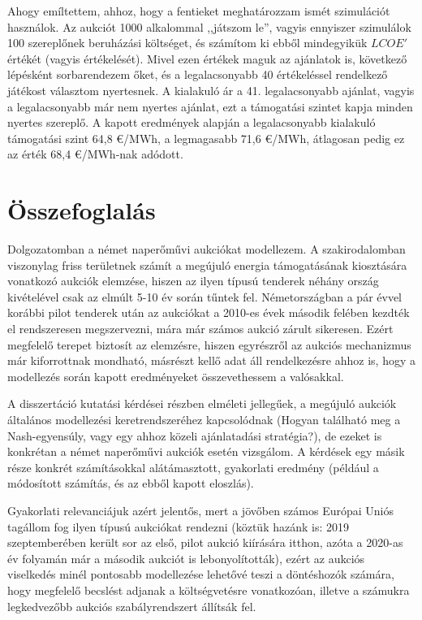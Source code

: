 \documentclass[twoside, magyar, showtrims]{corvinusphd}
\theoremstyle{plain}
\theoremstyle{remark}
\theoremstyle{definition}
\begin{document}
Ahogy emíltettem, ahhoz, hogy a fentieket meghatározzam ismét szimulációt használok.
Az aukciót 1000 alkalommal ,,játszom le'', vagyis ennyiszer
szimulálok 100 szereplőnek beruházási költséget, és számítom ki ebből
mindegyikük $LCOE'$ értékét (vagyis értékelését).
Mivel ezen értékek
maguk az ajánlatok is, következő lépésként sorbarendezem őket,
és a legalacsonyabb 40 értékeléssel rendelkező játékost választom nyertesnek.
A kialakuló ár a 41. legalacsonyabb ajánlat, vagyis a legalacsonyabb 
már nem nyertes ajánlat, ezt a támogatási szintet kapja minden nyertes szereplő.
A kapott eredmények alapján a legalacsonyabb kialakuló 
támogatási szint 64,8 €/MWh, a legmagasabb 71,6 €/MWh,
átlagosan pedig ez az érték 68,4 €/MWh-nak adódott.

\chapter{Összefoglalás}

\scwords Dolgozatomban a német naperőművi aukciókat modellezem.
A szakirodalomban viszonylag friss területnek számít
a megújuló energia támogatásának kiosztására
vonatkozó aukciók elemzése, hiszen az ilyen típusú
tenderek néhány ország kivételével csak az elmúlt 5-10
év során tűntek fel. Németországban a pár évvel korábbi
pilot tenderek után az aukciókat a 2010-es évek második felében
kezdték el rendszeresen megszervezni, mára már számos
aukció zárult sikeresen. Ezért megfelelő terepet biztosít
az elemzésre, hiszen egyrészről az aukciós mechanizmus
már kiforrottnak mondható, másrészt kellő adat
áll rendelkezésre ahhoz is, hogy a modellezés során
kapott eredményeket összevethessem a valósakkal.

A disszertáció kutatási kérdései részben elméleti jellegűek,
a megújuló aukciók általános modellezési keretrendszeréhez
kapcsolódnak (Hogyan található meg a Nash-egyensúly,
vagy egy ahhoz közeli ajánlatadási stratégia?),
de ezeket is konkrétan a német naperőművi
aukciók esetén vizsgálom. A kérdések egy másik része
konkrét számításokkal alátámasztott, gyakorlati eredmény
(például a módosított  számítás, és az ebből
kapott eloszlás).
 
Gyakorlati relevanciájuk
azért jelentős, mert a jövőben számos Európai Uniós
tagállom fog ilyen típusú aukciókat rendezni
(köztük hazánk is: 2019 szeptemberében került
sor az első, pilot aukció kiírására itthon, azóta a 2020-as
év folyamán már a második aukciót is lebonyolították), ezért
az aukciós viselkedés minél pontosabb modellezése
lehetővé teszi a döntéshozók számára, hogy megfelelő
becslést adjanak a költségvetésre vonatkozóan, 
illetve a számukra legkedvezőbb aukciós szabályrendszert állítsák fel.
\end{document}
